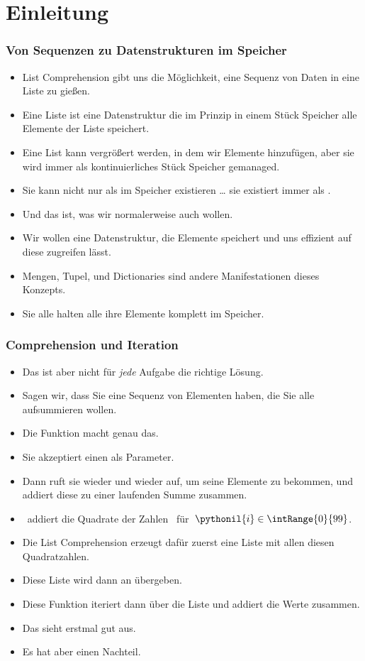 \documentclass[aspectratio=169,mathserif,notheorems]{beamer}%
\subtitle{38.~Generator-Ausdrücke}%
\begin{document}
%
%
\startPresentation%
%
\section{Einleitung}%
\begin{frame}%
\frametitle{Von Sequenzen zu Datenstrukturen im Speicher}%
\begin{itemize}%
\item List Comprehension gibt uns die Möglichkeit, eine Sequenz von Daten in eine Liste zu gießen.%
%
\item<2-> Eine Liste ist eine Datenstruktur die im Prinzip in einem Stück Speicher alle Elemente der Liste speichert.%
%
\item<3-> Eine List kann vergrößert werden, in dem wir Elemente hinzufügen, aber sie wird immer als kontinuierliches Stück Speicher gemanaged.%
%
\item<4-> Sie kann nicht nur als  im Speicher existieren {\dots} sie existiert immer als .%
%
\item<5-> Und das ist, was wir normalerweise auch wollen.%
%
\item<6-> Wir wollen eine Datenstruktur, die Elemente speichert und uns effizient auf diese zugreifen lässt.%
%
\item<7-> Mengen, Tupel, und Dictionaries sind andere Manifestationen dieses Konzepts.%
%
\item<8-> Sie alle halten alle ihre Elemente komplett im Speicher.%
\end{itemize}
\end{frame}%
%
\begin{frame}%
\frametitle{Comprehension und Iteration}%
%
\begin{itemize}%
\item Das ist aber nicht für \emph{jede} Aufgabe die richtige Lösung.%
%
\item<2-> Sagen wir, dass Sie eine Sequenz von Elementen haben, die Sie alle aufsummieren wollen.%
%
\item<3-> Die Funktion  macht genau das.%
%
\item<4-> Sie akzeptiert einen  als Parameter.%
%
\item<5-> Dann ruft sie wieder und wieder  auf, um seine Elemente zu bekommen, und addiert diese zu einer laufenden Summe zusammen.%
%
\item<6->  \DEzB\ addiert die Quadrate der Zahlen~ für~$\pythonil{i}\in\intRange{0}{99}$.%
%
\item<7-> Die List Comprehension erzeugt dafür zuerst eine Liste mit allen diesen Quadratzahlen.%
%
\item<8-> Diese Liste wird dann an  übergeben.%
%
\item<9-> Diese Funktion iteriert dann über die Liste und addiert die Werte zusammen.%
%
\item<10-> Das sieht erstmal gut aus.%
%
\item<11-> \alert{Es hat aber einen Nachteil.}%
\end{itemize}%
\end{frame}%
\end{document}
